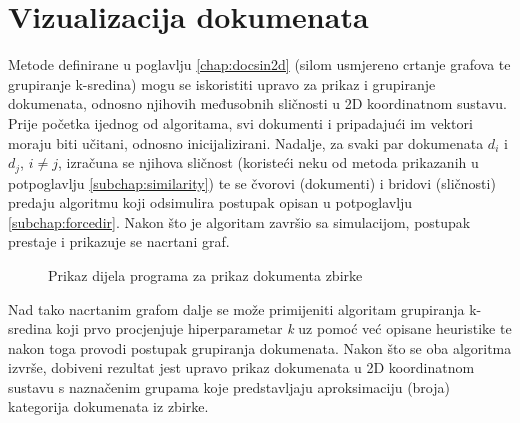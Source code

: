 \documentclass[times, utf8, zavrsni]{fer}
\begin{document}
\section{Vizualizacija dokumenata}
\label{sec:docdisplay}
Metode definirane u poglavlju \ref{chap:docsin2d} (silom usmjereno crtanje grafova te grupiranje k-sredina) mogu se iskoristiti upravo za prikaz i grupiranje dokumenata, odnosno njihovih međusobnih sličnosti u 2D koordinatnom sustavu. Prije početka ijednog od algoritama, svi dokumenti i pripadajući im vektori moraju biti učitani, odnosno inicijalizirani. Nadalje, za svaki par dokumenata $d_{i}$ i $d_{j}$, $i \neq j$, izračuna se njihova sličnost (koristeći neku od metoda prikazanih u potpoglavlju \ref{subchap:similarity}) te se čvorovi (dokumenti) i bridovi (sličnosti) predaju algoritmu koji odsimulira postupak opisan u potpoglavlju \ref{subchap:forcedir}. Nakon što je algoritam završio sa simulacijom, postupak prestaje i prikazuje se nacrtani graf.
\begin{figure}
\caption{Prikaz dijela programa za prikaz dokumenta zbirke}
\label{img:graph_program}
\end{figure}
Nad tako nacrtanim grafom dalje se može primijeniti algoritam grupiranja k-sredina koji prvo procjenjuje hiperparametar \textit{k} uz pomoć već opisane heuristike te nakon toga provodi postupak grupiranja dokumenata. Nakon što se oba algoritma izvrše, dobiveni rezultat jest upravo prikaz dokumenata u 2D koordinatnom sustavu s naznačenim grupama koje predstavljaju aproksimaciju (broja) kategorija dokumenata iz zbirke. \par
\end{document}
